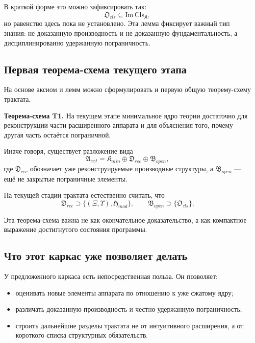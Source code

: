 \documentclass[12pt,a4paper]{article}
\begin{document}
В краткой форме это можно зафиксировать так:
\begin{equation}
\mathfrak{O}_{cls}\subseteq \mathrm{Im}\,\mathrm{Cls}_{\mathfrak{K}},
\end{equation}
но равенство здесь пока не установлено. Эта лемма фиксирует важный тип знания: не доказанную производность и не доказанную фундаментальность, а дисциплинированно удержанную пограничность.

\subsection{Первая теорема-схема текущего этапа}

На основе аксиом и лемм можно сформулировать и первую общую теорему-схему трактата.

\textbf{Теорема-схема T1.} На текущем этапе минимальное ядро теории достаточно для реконструкции части расширенного аппарата и для объяснения того, почему другая часть остаётся пограничной.

Иначе говоря, существует разложение вида
\begin{equation}
\mathfrak{A}_{ext}=\mathfrak{K}_{min} \oplus \mathfrak{D}_{rec} \oplus \mathfrak{B}_{open},
\end{equation}
где \(\mathfrak{D}_{rec}\) обозначает уже реконструируемые производные структуры, а \(\mathfrak{B}_{open}\) --- ещё не закрытые пограничные элементы.

На текущей стадии трактата естественно считать, что
\begin{equation}
\mathfrak{D}_{rec}\supset \{(\Xi,\Upsilon),\mathfrak{H}_{mod}\},
\qquad
\mathfrak{B}_{open}\supset \{\mathfrak{O}_{cls}\}.
\end{equation}

Эта теорема-схема важна не как окончательное доказательство, а как компактное выражение достигнутого состояния программы.

\subsection{Что этот каркас уже позволяет делать}

У предложенного каркаса есть непосредственная польза. Он позволяет:
\begin{itemize}
    \item оценивать новые элементы аппарата по отношению к уже сжатому ядру;
    \item различать доказанную производность и честно удержанную пограничность;
    \item строить дальнейшие разделы трактата не от интуитивного расширения, а от короткого списка структурных обязательств.
\end{itemize}
\end{document}
